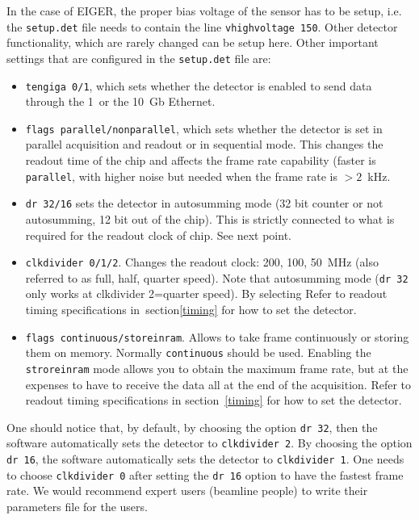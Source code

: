 \documentclass{article}
\newcommand{\E}{EIGER\xspace}
\begin{document}
In the case of \E, the proper bias voltage of the sensor has to be setup, i.e. the {\tt{setup.det}} file needs to contain the line {\tt{vhighvoltage 150}}. Other detector functionality, which are rarely changed can be setup here. 
Other important settings that are configured in the {\tt{setup.det}} file are:
\begin{itemize}
\item {\tt{tengiga 0/1}}, which sets whether the detector is enabled to send data through the 1~or the 10~Gb Ethernet.
\item {\tt{flags parallel/nonparallel}}, which sets whether the detector is set in parallel acquisition and readout or in sequential mode. This changes the readout time of the chip and affects the frame rate capability (faster is {\tt{parallel}}, with higher noise but needed when the frame rate is $>2$~kHz. 
\item {\tt{dr 32/16}} sets the detector in autosumming mode (32 bit counter or not autosumming, 12 bit out of the chip). This is strictly connected to what is required for the readout clock of chip. See next point.
\item {\tt{clkdivider 0/1/2}}. Changes the readout clock: 200, 100, 50~MHz (also referred to as full, half, quarter speed). Note that autosumming mode ({\tt{dr 32}} only works at {clkdivider 2}=quarter speed). By selecting Refer to readout timing specifications in~section\ref{timing} for how to set the detector. 
\item {\tt{flags continuous/storeinram}}. Allows to take frame continuously or storing them on memory. Normally {\tt{continuous}} should be used. Enabling the  {\tt{stroreinram}} mode allows you to obtain the maximum frame rate, but at the expenses to have to receive the data all at the end of the acquisition. Refer to readout timing specifications in section~\ref{timing} for how to set the detector.
\end{itemize}

One should notice that, by default, by choosing the option {\tt{dr 32}}, then the software automatically sets the detector to  {\tt{clkdivider 2}}. By choosing the option {\tt{dr 16}}, the software automatically sets the detector to  {\tt{clkdivider 1}}. One needs to choose {\tt{clkdivider 0}} after setting the {\tt{dr 16}} option to have the fastest frame rate. 
We would recommend expert users (beamline people) to write their parameters file for the users. 
\end{document}
